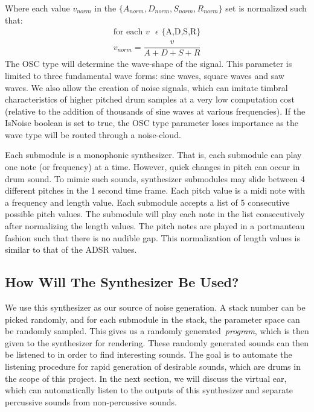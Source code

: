 \documentclass[\main/thesis.tex]{subfiles}
\begin{document}
Where each value $v_{norm}$ in the $\{A_{norm}, D_{norm},S_{norm},R_{norm}\} $ set is normalized such that:
\begin{align*}
\text{for each $v$ $\epsilon$ \{A,D,S,R\}} \\
v_{norm} = \dfrac{v}{A + D + S + R}
\end{align*}
 The OSC type will determine the wave-shape of the signal. This parameter is limited to three fundamental wave forms: sine waves, square waves and saw waves. We also allow the creation of noise signals, which can imitate timbral characteristics of higher pitched drum samples at a very low computation cost (relative to the addition of thousands of sine waves at various frequencies). If the IsNoise boolean is set to true, the OSC type parameter loses importance as the wave type will be routed through a noise-cloud. 

Each submodule is a monophonic synthesizer. That is, each submodule can play one note (or frequency) at a time. However, quick changes in pitch can occur in drum sound.  To mimic such sounds, synthesizer submodules may slide between 4 different pitches in the 1 second time frame. Each pitch value is a midi note with a frequency and length value. Each submodule accepts a list of 5 consecutive possible pitch values. The submodule will play each note in the list consecutively after normalizing the length values. The pitch notes are played in a portmanteau fashion such that there is no audible gap. This normalization of length values is similar to that of the ADSR values. 

\subsection{How Will The Synthesizer Be Used?}
We use this synthesizer as our source of noise generation. A stack number can be picked randomly, and for each submodule in the stack, the parameter space can be randomly sampled. This gives us a randomly generated~\textit{program}, which is then given to the synthesizer for rendering. These randomly generated sounds can then be listened to in order to find interesting sounds. The goal is to automate the listening procedure for rapid generation of desirable sounds, which are drums in the scope of this project. In the next section, we will discuss the virtual ear, which can automatically listen to the outputs of this synthesizer and separate percussive sounds from non-percussive sounds. 
\end{document}
